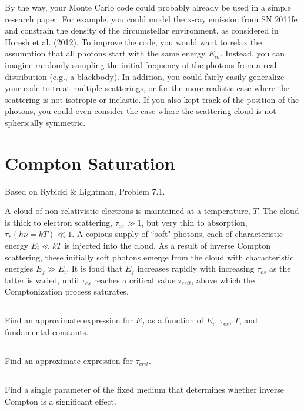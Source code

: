 \documentclass[11pt]{article}
\begin{document}
By the way, your Monte Carlo code could probably already be used in a simple
research paper. For example, you could model the x-ray emission from SN 2011fe
and constrain the density of the circumstellar environment, as considered in
Horesh et al. (2012). To improve the code, you would want to relax the
assumption that all photons start with the same energy $E_{in}$. Instead, you can
imagine randomly sampling the initial frequency of the photons from a real
distribution (e.g., a blackbody). In addition, you could fairly easily
generalize your code to treat multiple scatterings, or for the more realistic
case where the scattering is not isotropic or inelastic. If you also kept track
of the position of the photons, you could even consider the case where the
scattering cloud is not spherically symmetric.

\section{Compton Saturation}

Based on Rybicki \& Lightman, Problem 7.1.

A cloud of non-relativistic electrons is maintained at a temperature, $T$.  The cloud is thick to electron
scattering, $\tau_{es}\gg1$, but very thin to absorption, $\tau_*(h\nu=kT)\ll1$.  A copious
supply of ``soft" photons, each of characteristic energy $E_i\ll kT$ is injected into the cloud.
As a result of inverse Compton scattering, these initially soft photons emerge from the cloud 
with characteristic energies $E_f\gg E_i$.  It is foud that $E_f$ increases rapidly with
increasing $\tau_{es}$ as the latter is varied, until $\tau_{es}$ reaches a critical value
$\tau_{crit}$, above which the Comptonization process saturates.

\subsection{}
Find an approximate expression for $E_f$ as a function of $E_i$, $\tau_{es}$, $T$, and
fundamental constants.

\subsection{}
Find an approximate expression for $\tau_{crit}$.

\subsection{}
Find a single parameter of the fixed medium that determines whether inverse Compton is a significant
effect.
\end{document}
